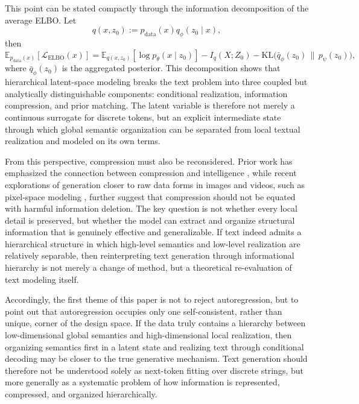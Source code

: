 This point can be stated compactly through the information decomposition of the average ELBO. Let
\begin{equation}
q(x,z_0):=p_{\mathrm{data}}(x)q_\phi(z_0\mid x),
\end{equation}
then
\begin{equation}
\mathbb E_{p_{\mathrm{data}}(x)}[\mathcal L_{\mathrm{ELBO}}(x)]
=
\mathbb E_{q(x,z_0)}[\log p_\theta(x\mid z_0)]
-
I_q(X;Z_0)
-
\mathrm{KL}\!\big(\bar q_\phi(z_0)\,\|\,p_\psi(z_0)\big),
\label{eq:after_avg_elbo}
\end{equation}
where $\bar q_\phi(z_0)$ is the aggregated posterior. This decomposition shows that hierarchical latent-space modeling breaks the text problem into three coupled but analytically distinguishable components: conditional realization, information compression, and prior matching. The latent variable is therefore not merely a continuous surrogate for discrete tokens, but an explicit intermediate state through which global semantic organization can be separated from local textual realization and modeled on its own terms.

From this perspective, compression must also be reconsidered. Prior work has emphasized the connection between compression and intelligence \citep{huang2024compression}, while recent explorations of generation closer to raw data forms in images and videos, such as pixel-space modeling \citep{deng2026generative}, further suggest that compression should not be equated with harmful information deletion. The key question is not whether every local detail is preserved, but whether the model can extract and organize structural information that is genuinely effective and generalizable. If text indeed admits a hierarchical structure in which high-level semantics and low-level realization are relatively separable, then reinterpreting text generation through informational hierarchy is not merely a change of method, but a theoretical re-evaluation of text modeling itself.

Accordingly, the first theme of this paper is not to reject autoregression, but to point out that autoregression occupies only one self-consistent, rather than unique, corner of the design space. If the data truly contains a hierarchy between low-dimensional global semantics and high-dimensional local realization, then organizing semantics first in a latent state and realizing text through conditional decoding may be closer to the true generative mechanism. Text generation should therefore not be understood solely as next-token fitting over discrete strings, but more generally as a systematic problem of how information is represented, compressed, and organized hierarchically.

